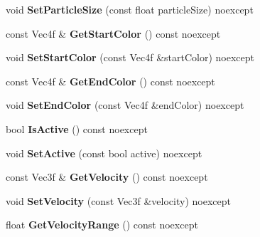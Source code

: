 \begin{DoxyCompactItemize}
void {\bfseries Set\+Particle\+Size} (const float particle\+Size) noexcept
\item 
\mbox{\label{class_blade_1_1_emitter_component_ab0b5ea77ae788052705ce92f2f3d503c}} 
const Vec4f \& {\bfseries Get\+Start\+Color} () const noexcept
\item 
\mbox{\label{class_blade_1_1_emitter_component_af19b7a5444da8278cdc626be085ae104}} 
void {\bfseries Set\+Start\+Color} (const Vec4f \&start\+Color) noexcept
\item 
\mbox{\label{class_blade_1_1_emitter_component_af9951179ffeab5a1dbfc4275e91998b7}} 
const Vec4f \& {\bfseries Get\+End\+Color} () const noexcept
\item 
\mbox{\label{class_blade_1_1_emitter_component_a6ba83c77a8e201e5dda46ba4701baeda}} 
void {\bfseries Set\+End\+Color} (const Vec4f \&end\+Color) noexcept
\item 
\mbox{\label{class_blade_1_1_emitter_component_a95c12cc9696a8f681a80744c7eaf07fe}} 
bool {\bfseries Is\+Active} () const noexcept
\item 
\mbox{\label{class_blade_1_1_emitter_component_a469c2740608d300833249638a0cbeefe}} 
void {\bfseries Set\+Active} (const bool active) noexcept
\item 
\mbox{\label{class_blade_1_1_emitter_component_a9b039d1090c75e0917d9e9a9f7506442}} 
const Vec3f \& {\bfseries Get\+Velocity} () const noexcept
\item 
\mbox{\label{class_blade_1_1_emitter_component_aee9bdd0f76acfdee9416eb95cf32e1b2}} 
void {\bfseries Set\+Velocity} (const Vec3f \&velocity) noexcept
\item 
\mbox{\label{class_blade_1_1_emitter_component_a173eb4eeaefadd1ee471a2f24d494369}} 
float {\bfseries Get\+Velocity\+Range} () const noexcept
\item 
\mbox{\label{class_blade_1_1_emitter_component_a6b621b2372cf004340ce7fee27876cef}} 

\end{DoxyCompactItemize}
